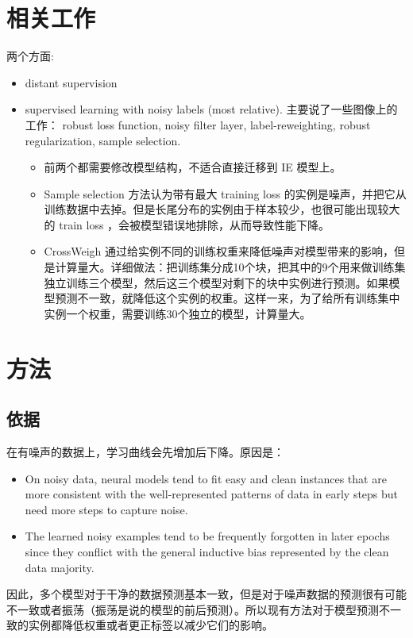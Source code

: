 \documentclass{article}
\begin{document}
\section{相关工作}
两个方面: 
\begin{itemize}
    \item distant supervision
    \item supervised learning with noisy labels (most relative). 主要说了一些图像上的工作： robust loss function, noisy filter layer, label-reweighting, robust regularization, sample selection. 
    \begin{itemize}
        \item 前两个都需要修改模型结构，不适合直接迁移到 IE 模型上。 \item Sample selection 方法认为带有最大 training loss 的实例是噪声，并把它从训练数据中去掉。但是长尾分布的实例由于样本较少，也很可能出现较大的 train loss ，会被模型错误地排除，从而导致性能下降。
        \item CrossWeigh 通过给实例不同的训练权重来降低噪声对模型带来的影响，但是计算量大。详细做法：把训练集分成10个块，把其中的9个用来做训练集独立训练三个模型，然后这三个模型对剩下的块中实例进行预测。如果模型预测不一致，就降低这个实例的权重。这样一来，为了给所有训练集中实例一个权重，需要训练30个独立的模型，计算量大。
    \end{itemize}
\end{itemize}

\section{方法}
\subsection{依据}
在有噪声的数据上，学习曲线会先增加后下降。原因是：
\begin{itemize}
    \item On noisy data, neural models tend to fit easy and clean instances that are more consistent with the well-represented patterns of data in early steps but need more steps to capture noise.
    \item The learned noisy examples tend to be frequently forgotten in later epochs since they conflict with the general inductive bias represented by the clean data majority.
\end{itemize}
因此，多个模型对于干净的数据预测基本一致，但是对于噪声数据的预测很有可能不一致或者振荡（振荡是说的模型的前后预测）。所以现有方法对于模型预测不一致的实例都降低权重或者更正标签以减少它们的影响。
\end{document}

